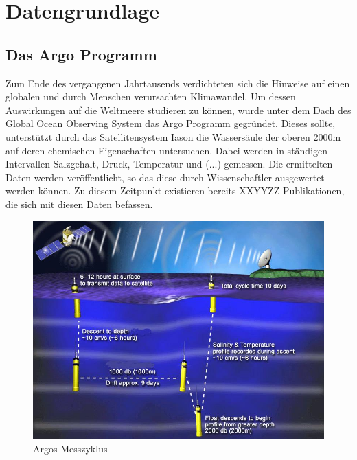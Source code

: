  \section{Datengrundlage}
    
    

    \subsection{Das Argo Programm}

    
    Zum Ende des vergangenen Jahrtausends verdichteten sich die Hinweise auf einen globalen und durch Menschen verursachten Klimawandel. Um dessen Auswirkungen auf die Weltmeere studieren zu können, wurde unter dem Dach des Global Ocean Observing System das Argo Programm gegründet. Dieses sollte, unterstützt durch das Satellitensystem Iason die Wassersäule der oberen 2000m auf deren chemischen Eigenschaften untersuchen. Dabei werden in ständigen Intervallen Salzgehalt, Druck, Temperatur und (...) gemessen. Die ermittelten Daten werden veröffentlicht, so das diese durch Wissenschaftler ausgewertet werden können. Zu diesem Zeitpunkt existieren bereits XXYYZZ Publikationen, die sich mit diesen Daten befassen.
    
    
    \begin{figure}[h]
        \centering
        \includegraphics{pix/operation_park_profile.jpg}
        \caption[Argos Messzyklus - Bildquelle: http://www.argo.ucsd.edu]{Argos  Messzyklus}
        \label{fig:Argo-messzyklus}
    \end{figure}

